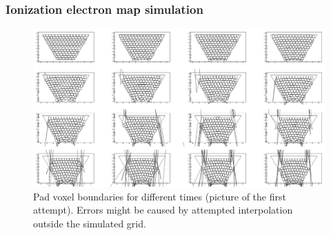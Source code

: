 \documentclass{beamer}
\begin{document}
	\begin{frame}
		\frametitle{Ionization electron map simulation}
		\begin{figure}
			\centering
			\includegraphics[height=0.68\textheight]{../images/pads_dist.png}
			\caption{Pad voxel boundaries for different times (picture of the first attempt). Errors might be caused by attempted interpolation outside the simulated grid.}
		\end{figure}
	\end{frame}
	
	
\end{document}
